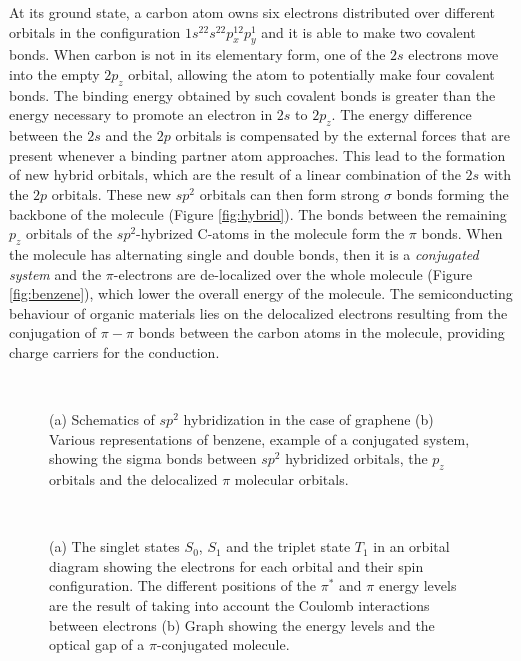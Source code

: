 \documentclass  [
  paper    = a4,
  BCOR     = 10mm,
  twoside,
  fontsize = 12pt,
  fleqn,
  toc      = bibnumbered,
  toc      = listofnumbered,
  numbers  = noendperiod,
  headings = normal,
  listof   = leveldown,
  version  = 3.03
]                                       {scrreprt}
\begin{document}
At its ground state, a carbon atom owns six electrons distributed over different orbitals in the configuration $1s^22s^22p_x^12p_y^1$ and it is able to make two covalent bonds. When carbon is not in its elementary form, one of the $2s$ electrons move into the empty $2p_z$ orbital, allowing the atom to potentially make four covalent bonds. The binding energy obtained by such covalent bonds is greater than the energy necessary to promote an electron in $2s$ to $2p_z$. The energy difference between the $2s$ and the $2p$ orbitals is compensated by the external forces that are present whenever a binding partner atom approaches. This lead to the formation of new hybrid orbitals, which are the result of a linear combination of the $2s$ with the $2p$ orbitals. These new $sp^2$ orbitals can then form strong $\sigma$ bonds forming the backbone of the molecule (Figure \ref{fig:hybrid}). The bonds between the remaining $p_z$ orbitals of the $sp^2$-hybrized C-atoms in the molecule form the $\pi$ bonds.  When the molecule has alternating single and double bonds, then it is a \emph{conjugated system} and the $\pi$-electrons are de-localized over the whole molecule (Figure \ref{fig:benzene}), which lower the overall energy of the molecule. The semiconducting behaviour of organic materials lies on the delocalized electrons resulting from the conjugation of $\pi-\pi$ bonds between the carbon atoms in the molecule, providing charge carriers for the conduction. 
\begin{figure}[t]
	\centering%
	\qquad
	\\
	\caption{\footnotesize (a) Schematics of $sp^2$ hybridization in the case of graphene\cite{web:cavendish} (b) Various representations of benzene, example of a conjugated system, showing the sigma bonds between $sp^2$ hybridized orbitals, the $p_z$ orbitals and the delocalized $\pi$ molecular orbitals.}
	\label{fig:electronic1}
\end{figure}
\begin{figure}[t]
	\centering%
	\qquad
	\\
	\caption{\footnotesize (a) The singlet states $S_0$, $S_1$ and the triplet state $T_1$ in an orbital diagram showing the electrons for each orbital and their spin configuration. The different positions of the $\pi^*$ and $\pi$ energy levels are the result of taking into account the Coulomb interactions between electrons\cite{book:koehler} (b) Graph showing the energy levels and the optical gap of a $\pi$-conjugated molecule\cite{book:brutting}.}
	\label{fig:electronic2}
\end{figure}
\end{document}
